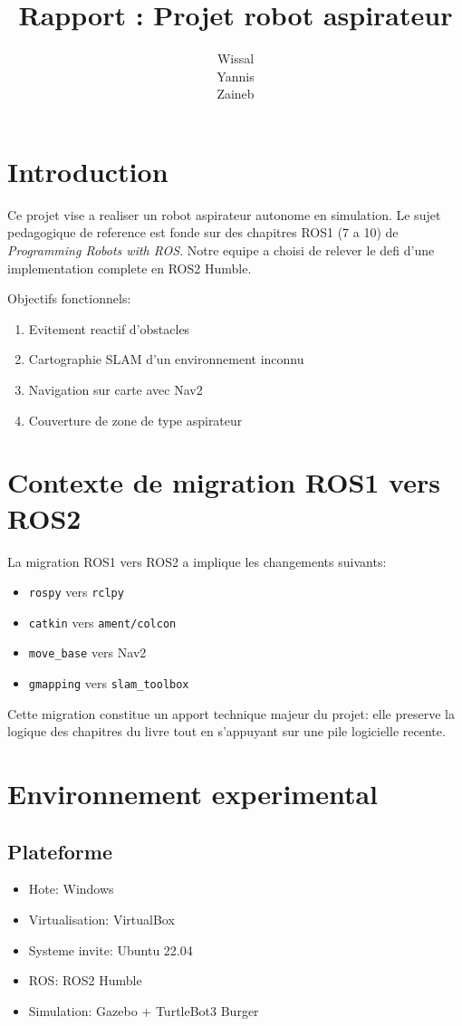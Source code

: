 \documentclass[11pt,a4paper,french]{imta}
\title{Rapport : Projet robot aspirateur}
\author{
\tDAHANI Wissal \\
\tLOUMOUAMOU Yannis\\
\tMAHMOUDI Zaineb\\
}
\begin{document}
\section{Introduction}
Ce projet vise a realiser un robot aspirateur autonome en simulation. Le sujet pedagogique de reference est fonde sur des chapitres ROS1 (7 a 10) de \emph{Programming Robots with ROS}. Notre equipe a choisi de relever le defi d'une implementation complete en ROS2 Humble.

Objectifs fonctionnels:
\begin{enumerate}
  \item Evitement reactif d'obstacles
  \item Cartographie SLAM d'un environnement inconnu
  \item Navigation sur carte avec Nav2
  \item Couverture de zone de type aspirateur
\end{enumerate}

\section{Contexte de migration ROS1 vers ROS2}
La migration ROS1 vers ROS2 a implique les changements suivants:
\begin{itemize}
  \item \texttt{rospy} vers \texttt{rclpy}
  \item \texttt{catkin} vers \texttt{ament/colcon}
  \item \texttt{move\_base} vers Nav2
  \item \texttt{gmapping} vers \texttt{slam\_toolbox}
\end{itemize}

Cette migration constitue un apport technique majeur du projet: elle preserve la logique des chapitres du livre tout en s'appuyant sur une pile logicielle recente.

\section{Environnement experimental}
\subsection{Plateforme}
\begin{itemize}
  \item Hote: Windows
  \item Virtualisation: VirtualBox
  \item Systeme invite: Ubuntu 22.04
  \item ROS: ROS2 Humble
  \item Simulation: Gazebo + TurtleBot3 Burger
\end{itemize}
\end{document}
